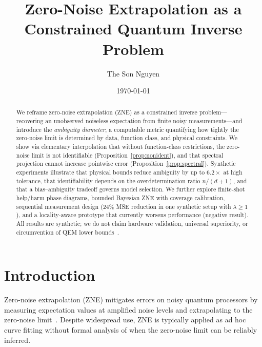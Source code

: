 \documentclass[aps,pra,twocolumn,superscriptaddress]{revtex4-2}
\begin{document}
\title{Zero-Noise Extrapolation as a Constrained Quantum Inverse Problem}

\author{The Son Nguyen}

\date{\today}

\begin{abstract}
We reframe zero-noise extrapolation (ZNE) as a constrained inverse problem---recovering an unobserved noiseless expectation from finite noisy measurements---and introduce the \emph{ambiguity diameter}, a computable metric quantifying how tightly the zero-noise limit is determined by data, function class, and physical constraints.
We show via elementary interpolation that without function-class restrictions, the zero-noise limit is not identifiable (Proposition~\ref{prop:nonident}), and that spectral projection cannot increase pointwise error (Proposition~\ref{prop:spectral}).
Synthetic experiments illustrate that physical bounds reduce ambiguity by up to $6.2\times$ at high tolerance, that identifiability depends on the overdetermination ratio $n/(d+1)$, and that a bias--ambiguity tradeoff governs model selection.
We further explore finite-shot help/harm phase diagrams, bounded Bayesian ZNE with coverage calibration, sequential measurement design (24\% MSE reduction in one synthetic setup with $\lambda \geq 1$), and a locality-aware prototype that currently worsens performance (negative result).
All results are synthetic; we do not claim hardware validation, universal superiority, or circumvention of QEM lower bounds~\cite{Takagi2022,Quek2024}.
\end{abstract}

\maketitle

\section{Introduction}
\label{sec:intro}

Zero-noise extrapolation (ZNE) mitigates errors on noisy quantum processors by measuring expectation values at amplified noise levels and extrapolating to the zero-noise limit~\cite{LiBenjamin2017,Temme2017,GiurgicaTiron2020}.
Despite widespread use, ZNE is typically applied as ad hoc curve fitting without formal analysis of when the zero-noise limit can be reliably inferred.
\end{document}
